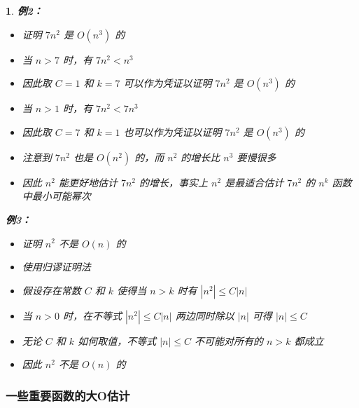 \documentclass[UTF8]{report}
\theoremstyle{MyLineTheoremStyle} %
\theoremstyle{MyBlockTheoremStyle} %
\theoremstyle{MySubsubsectionStyle} %
\newtheorem{definition}{}
\begin{document}
\begin{definition}
    \textbf{例2：}
    \begin{itemize}
        \item 证明 $7n^2$ 是 $O(n^3)$ 的
        \item 当 $n > 7$ 时，有 $7n^2 < n^3$
        \item 因此取 $C = 1$ 和 $k = 7$ 可以作为凭证以证明 $7n^2$ 是 $O(n^3)$ 的
        \item 当 $n > 1$ 时，有 $7n^2 < 7n^3$
        \item 因此取 $C = 7$ 和 $k = 1$ 也可以作为凭证以证明 $7n^2$ 是 $O(n^3)$ 的
        \item 注意到 $7n^2$ 也是 $O(n^2)$ 的，而 $n^2$ 的增长比 $n^3$ 要慢很多
        \item 因此 $n^2$ 能更好地估计 $7n^2$ 的增长，事实上 $n^2$ 是最适合估计 $7n^2$ 的 $n^k$ 函数中最小可能幂次
    \end{itemize}

    \textbf{例3：}
    \begin{itemize}
        \item 证明 $n^2$ 不是 $O(n)$ 的
        \item 使用归谬证明法
        \item 假设存在常数 $C$ 和 $k$ 使得当 $n > k$ 时有 $|n^2| \leq C|n|$
        \item 当 $n > 0$ 时，在不等式 $|n^2| \leq C|n|$ 两边同时除以 $|n|$ 可得 $|n| \leq C$
        \item 无论 $C$ 和 $k$ 如何取值，不等式 $|n| \leq C$ 不可能对所有的 $n > k$ 都成立
        \item 因此 $n^2$ 不是 $O(n)$ 的
    \end{itemize}
\end{definition}

\subsubsection{一些重要函数的大O估计}
\end{document}
